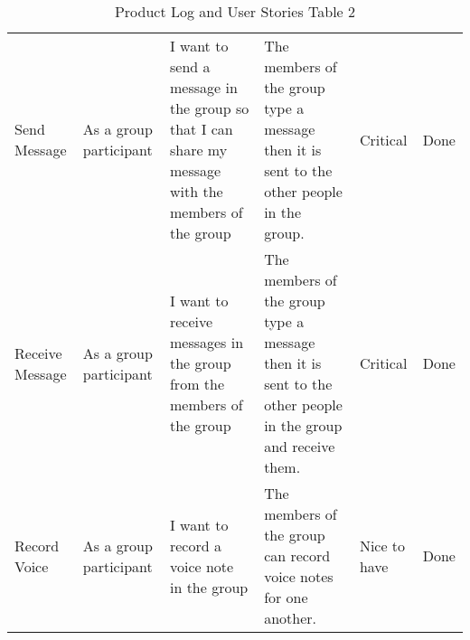 \documentclass[a4paper]{article}
\begin{document}
\begin{table}
\begin{tabular}{p{1.5cm} p{2.5cm} p{3cm} p{3cm} p{1cm} p{1cm}}
Send Message & As a group participant & I want to send a message in the group so that I can share my message with the members of the group & The members of the group type a message then it is sent to the other people in the group. & Critical & Done\\ \cmidrule(l){2-6} %

Receive Message & As a group participant & I want to receive messages in the group from the members of the group & The members of the group type a message then it is sent to the other people in the group and receive them. & Critical & Done\\ \cmidrule(l){2-6} %

Record Voice & As a group participant & I want to record a voice note in the group & The members of the group can record voice notes for one another. & Nice to have & Done\\ %

\midrule %
\midrule %
\end{tabular}
\caption{Product Log and User Stories Table 2} %
\label{tab:template} %
\end{table}
\end{document}
